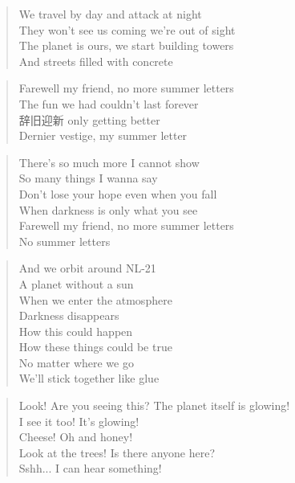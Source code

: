 \begin{verse}
We travel by day and attack at night \\
They won't see us coming we're out of sight \\
The planet is ours, we start building towers \\
And streets filled with concrete
\end{verse}

\begin{verse}
Farewell my friend, no more summer letters \\
The fun we had couldn't last forever  \\
辞旧迎新 only getting better \\
Dernier vestige, my summer letter
\end{verse}

\begin{verse}
There's so much more I cannot show \\ 
So many things I wanna say \\
Don't lose your hope even when you fall \\
When darkness is only what you see \\
Farewell my friend, no more summer letters \\
No summer letters
\end{verse}

\clearpage
{}

\begin{verse}
And we orbit around NL-21 \\ 
A planet without a sun \\ 
When we enter the atmosphere \\ 
Darkness disappears \\ 
How this could happen \\ 
How these things could be true \\ 
No matter where we go \\ 
We'll stick together like glue
\end{verse}

\begin{verse}
Look! Are you seeing this? The planet itself is glowing!\\ 
I see it too! It's glowing! \\ 
Cheese! Oh and honey! \\ 
Look at the trees! Is there anyone here? \\ 
Sshh... I can hear something! 
\end{verse}

